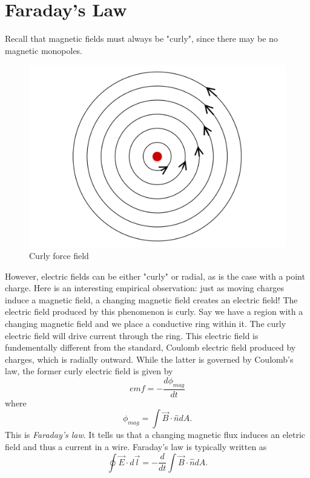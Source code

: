 \documentclass[nobib]{tufte-handout}
\begin{document}
\section{Faraday's Law}
Recall that magnetic fields must always be "curly", since there may 
be no magnetic monopoles. 
\begin{figure}
    \caption{Curly force field}
    \begin{center}
        \includegraphics{images/curly.png}
    \end{center}
\end{figure}
However, electric fields can be either "curly" or radial, 
as is the case with a point charge. Here is an interesting 
empirical observation: just as moving charges induce a 
magnetic field, a changing magnetic field creates an electric 
field! The electric field produced by this phenomenon is curly. 
Say we have a region with a changing magnetic field and we place
a conductive ring within it. The curly electric field will drive current 
through the ring.
This electric field is fundementally different from the standard, Coulomb 
electric field produced by charges, which is radially outward. 
While the latter is governed by Coulomb's law, the former curly electric field 
is given by 
\[emf = -\frac{d \phi_{mag}}{dt}\]
where 
\[\phi_{mag} = \int \vec{B} \cdot \hat{n} dA.\]
This is \emph{Faraday's law}. It tells us that a changing magnetic flux 
induces an eletric field and thus a current in a wire. Faraday's law is 
typically written as 
\[\oint \vec{E} \cdot d\vec{l} = -\frac{d}{dt} \int \vec{B} \cdot \hat{n} dA.\]
\end{document}

